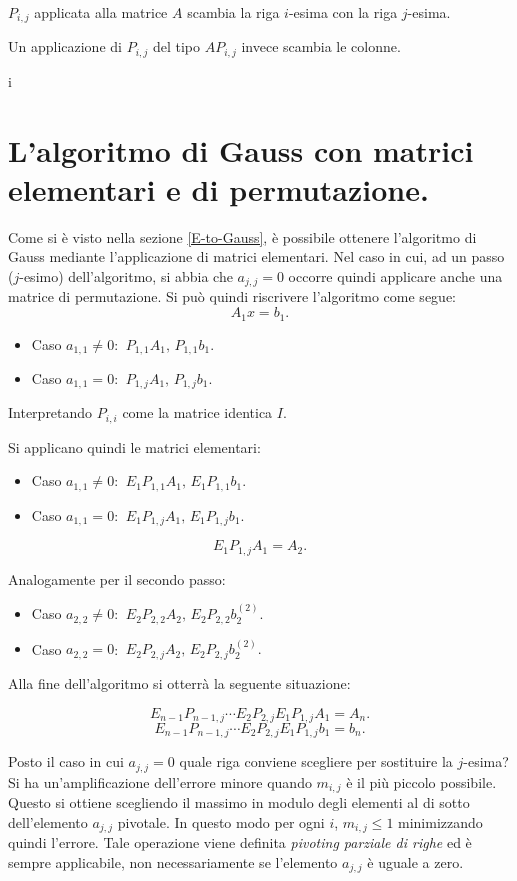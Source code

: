 $P_{i,j}$ applicata alla matrice $A$ scambia la riga $i$-esima con la riga
$j$-esima.
\begin{osse}
Un applicazione di $P_{i,j}$ del tipo $AP_{i,j}$ invece scambia le colonne.
\end{osse}
i
\section{L'algoritmo di Gauss con matrici elementari e di permutazione.}
Come si è visto nella sezione \ref{E-to-Gauss}, è possibile ottenere
l'algoritmo di Gauss mediante l'applicazione di matrici elementari. Nel
caso in cui, ad un passo ($j$-esimo) dell'algoritmo, si abbia che $a_{j,j}= 0$
occorre quindi applicare anche una matrice di permutazione.
Si può quindi riscrivere l'algoritmo come segue:
\[A_1x = b_1.\]
\begin{itemize}
\item[]Caso $a_{1,1} \neq 0$:
$\ P_{1,1}A_1, \, P_{1,1}b_1.$
\item[]Caso $a_{1,1} = 0$:
$\ P_{1,j}A_1, \, P_{1,j}b_1.$
\end{itemize}
Interpretando $P_{i,i}$ come la matrice identica $I$.

Si applicano quindi le matrici elementari:
\begin{itemize}
\item[]Caso $a_{1,1} \neq 0$:
$\ E_1P_{1,1}A_1, \, E_1P_{1,1}b_1.$
\item[]Caso $a_{1,1} = 0$:
$\ E_1P_{1,j}A_1, \, E_1P_{1,j}b_1.$
\end{itemize}
\[E_1P_{1,j}A_1 = A_2.\]

Analogamente per il secondo passo:
\begin{itemize}
\item[]Caso $a_{2,2} \neq 0$:
$\ E_2P_{2,2}A_2, \, E_2P_{2,2}b_2^{(2)}.$
\item[]Caso $a_{2,2} = 0$:
$\ E_2P_{2,j}A_2, \, E_2P_{2,j}b_2^{(2)}.$
\end{itemize}

Alla fine dell'algoritmo si otterrà la seguente situazione:

\[
E_{n-1}P_{n-1,j} \cdots E_{2}P_{2,j}E_{1}P_{1,j}A_{1} = A_n.
\]
\[
E_{n-1}P_{n-1,j} \cdots E_{2}P_{2,j}E_{1}P_{1,j}b_{1} = b_n.
\]

Posto il caso in cui $a_{j,j} = 0$ quale riga conviene scegliere per
sostituire la $j$-esima? Si ha un'amplificazione dell'errore minore quando
$m_{i,j}$ è il più piccolo possibile. Questo si ottiene scegliendo il massimo
in modulo degli elementi al di sotto dell'elemento $a_{j,j}$ pivotale.
In questo modo per ogni $i$,  $m_{i,j} \leq 1$ minimizzando quindi l'errore.
Tale operazione viene definita \emph{pivoting parziale di righe} ed è sempre
applicabile, non necessariamente se l'elemento $a_{j,j}$ è uguale a zero.

